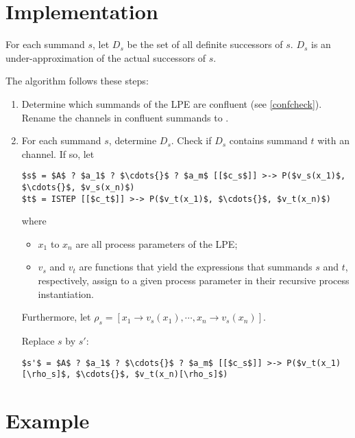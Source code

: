 \section{Implementation}

For each summand $s$, let $D_s$ be the set of all definite successors of $s$.
$D_s$ is an under-approximation of the actual successors of $s$.

The algorithm follows these steps:

\begin{enumerate}

\item Determine which \istep{} summands of the LPE are confluent (see \ref{confcheck}).
Rename the \istep{} channels in confluent \istep{} summands to \cistep{}.

\item For each summand $s$, determine $D_s$.
Check if $D_s$ contains summand $t$ with an \cistep{} channel.
If so, let

\begin{lstlisting}[mathescape]
$s$ = $A$ ? $a_1$ ? $\cdots{}$ ? $a_m$ [[$c_s$]] >-> P($v_s(x_1)$, $\cdots{}$, $v_s(x_n)$)
$t$ = ISTEP [[$c_t$]] >-> P($v_t(x_1)$, $\cdots{}$, $v_t(x_n)$)
\end{lstlisting}

where

\begin{itemize}
\item $x_1$ to $x_n$ are all process parameters of the LPE;
\item $v_s$ and $v_t$ are functions that yield the expressions that summands $s$ and $t$, respectively, assign to a given process parameter in their recursive process instantiation.
\end{itemize}

Furthermore, let $\rho_s = [x_1 \rightarrow v_s(x_1), \cdots{}, x_n \rightarrow v_s(x_n)]$.

Replace $s$ by $s'$:

\begin{lstlisting}[mathescape]
$s'$ = $A$ ? $a_1$ ? $\cdots{}$ ? $a_m$ [[$c_s$]] >-> P($v_t(x_1)[\rho_s]$, $\cdots{}$, $v_t(x_n)[\rho_s]$)
\end{lstlisting}

\end{enumerate}

\clearpage
\section{Example}

